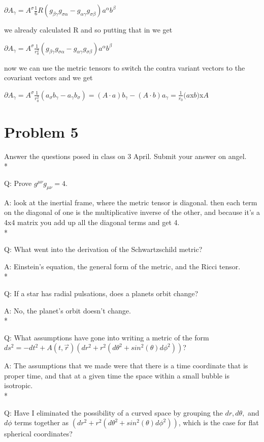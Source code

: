 \documentclass{article}
\begin{document}
$\partial A_{\gamma}=A^{\sigma}\frac{1}{6}R(g_{\beta\gamma}g_{\sigma\alpha}-g_{\alpha\gamma}g_{\sigma\beta})a^{\alpha}b^{\beta}$

we already calculated R and so putting that in we get

$\partial A_{\gamma}=A^{\sigma}\frac{1}{r_{0}^{2}}(g_{\beta\gamma}g_{\sigma\alpha}-g_{\alpha\gamma}g_{\sigma\beta})a^{\alpha}b^{\beta}$

now we can use the metric tensors to switch the contra variant vectors to the covariant vectors and we get

$\partial A_{\gamma}=A^{\sigma}\frac{1}{r_{0}^{2}}(a_{\sigma}b_{\gamma}-a_{\gamma}b_{\sigma})=(A\cdot a)b_{\gamma}-(A\cdot b)a_{\gamma}=\frac{1}{r_{0}}(a$x$b)$x$A$

\section{Problem 5}
\hspace{0.5cm}Answer the questions posed in class on 3 April. Submit your answer on angel.
\\*

Q: Prove $g^{\mu\nu}g_{\mu\nu}=4$. 

A: look at the inertial frame, where the metric tensor is diagonal. then each term on the diagonal of one is the multiplicative inverse of the other, and because it's a 4x4 matrix you add up all the diagonal terms and get 4. 
\\*

Q: What went into the derivation of the Schwartzschild metric?

A: Einstein’s equation, the general form of the metric, and the Ricci tensor. 
\\*

Q: If a star has radial pulsations, does a planets orbit change?

A: No, the planet's orbit doesn’t change. 
\\*

Q: What assumptions have gone into writing a metric of the form 
$ds^{2}=-dt^{2}+A(t,\vec r)(dr^{2}+r^{2}(d\theta ^{2}+sin^{2}(\theta) d\phi^{2}))$?

A: The assumptions that we made were that there is a time coordinate that is proper time, and that at a given time the space within a small bubble is isotropic.
\\*

Q: Have I eliminated the possibility of a curved space by grouping the $dr, d\theta,$ and $d\phi$ terms together as $(dr^{2}+r^{2}(d\theta ^{2}+sin^{2}(\theta) d\phi^{2}))$, which is the case for flat spherical coordinates? 
\end{document}
